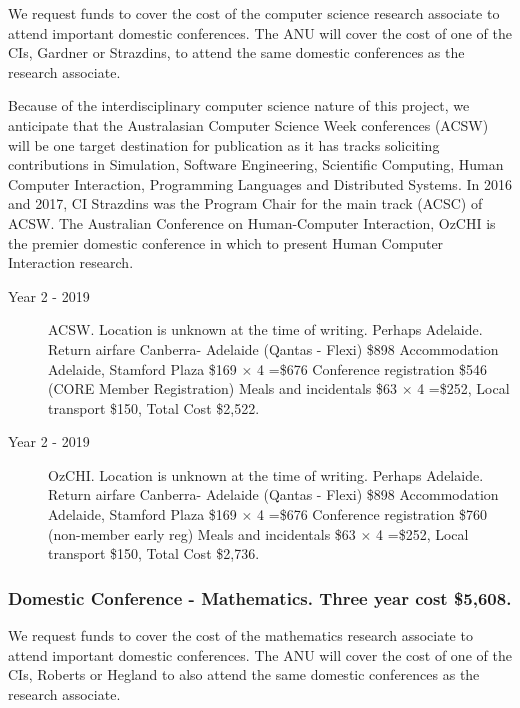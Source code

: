 \documentclass[a4paper,twoside,12pt,compact]{article}
\begin{document}
We request funds to cover the cost of the computer science research associate to attend important domestic conferences.  The ANU will cover the cost of one of the CIs, Gardner or Strazdins, to attend the same domestic conferences as the research associate. 

Because of the interdisciplinary computer science nature of this project, we anticipate that the Australasian Computer Science Week conferences (ACSW) will be one target destination for publication as it has tracks soliciting contributions in Simulation, Software Engineering, Scientific Computing, Human Computer Interaction, Programming Languages and Distributed Systems. In 2016 and 2017, CI Strazdins was the Program Chair for the main track (ACSC) of ACSW. 
The Australian Conference on Human-Computer Interaction, OzCHI is the premier domestic conference in which to present Human Computer Interaction research. 

\begin{description}


\item[Year 2 - 2019] ACSW.
Location is unknown at the time of writing. Perhaps Adelaide.
Return airfare Canberra- Adelaide (Qantas - Flexi) \$898
Accommodation Adelaide, Stamford Plaza \$169 $\times$ 4 =\$676
Conference registration \$546 (CORE Member Registration)
Meals and incidentals \$63 $\times$ 4 =\$252, Local transport \$150, 
Total Cost \$2,522.

\item[Year 2 - 2019] OzCHI.
Location is unknown at the time of writing. Perhaps Adelaide.
Return airfare Canberra- Adelaide (Qantas - Flexi) \$898
Accommodation Adelaide, Stamford Plaza \$169 $\times$ 4 =\$676
Conference registration \$760 (non-member early reg)
Meals and incidentals \$63 $\times$ 4 =\$252, Local transport \$150, 
Total Cost \$2,736.




\end{description}



\subsubsection*{Domestic Conference - Mathematics. Three year cost \$5,608.}

We request funds to cover the cost of the mathematics research associate to attend important domestic conferences.  The ANU will cover the cost of one of the CIs, Roberts or Hegland to also attend the same domestic conferences as the research associate. 
\end{document}
